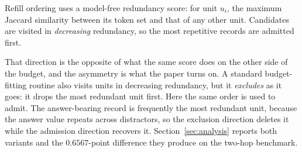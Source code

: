 Refill ordering uses a model-free redundancy score: for unit $u_i$, the maximum Jaccard
similarity between its token set and that of any other unit. Candidates are visited in
\emph{decreasing} redundancy, so the most repetitive records are admitted first.

That direction is the opposite of what the same score does on the other side of the budget, and
the asymmetry is what the paper turns on. A standard budget-fitting routine also visits units in
decreasing redundancy, but it \emph{excludes} as it goes: it drops the most redundant unit first.
Here the same order is used to admit. The answer-bearing record is frequently the most redundant
unit, because the answer value repeats across distractors, so the exclusion direction deletes it
while the admission direction recovers it. Section~\ref{sec:analysis} reports both variants and
the $0.6567$-point difference they produce on the two-hop benchmark.
